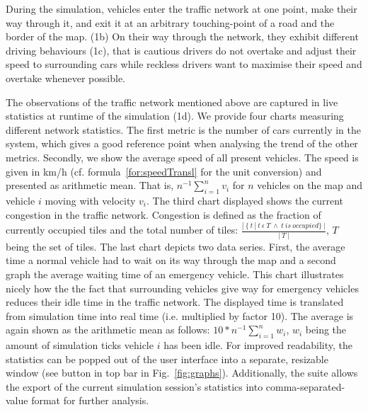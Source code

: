 During the simulation, vehicles enter the traffic network at one point, make their way through it, and exit it at an arbitrary touching-point of a road and the border of the map. (1b) On their way through the network, they exhibit different driving behaviours (1c), that is cautious drivers do not overtake and adjust their speed to surrounding cars while reckless drivers want to maximise their speed and overtake whenever possible.

The observations of the traffic network mentioned above are captured in live statistics at runtime of the simulation (1d).  We provide four charts measuring different network statistics. The first metric is the number of cars currently in the system, which gives a good reference point when analysing the trend of the other metrics. Secondly, we show the average speed of all present vehicles. The speed is given in km/h (cf. formula~\ref{for:speedTransl} for the unit conversion) and presented as arithmetic mean. That is, $ n^{-1}\sum\limits_{i=1}^n v_i$ for $n$ vehicles on the map and vehicle $i$ moving with velocity $v_i$. The third chart displayed shows the current congestion in the traffic network. Congestion is defined as the fraction of currently occupied tiles and the total number of tiles: $\frac{|\:\lbrace \:t\:|\:t\:\epsilon\:T\:\wedge\:t\:is\:occupied\rbrace\:|}{|\:T\:|}$, $T$ being the set of tiles. The last chart depicts two data series. First, the average time a normal vehicle had to wait on its way through the map and a second graph the average waiting time of an emergency vehicle. This chart illustrates nicely how the the fact that surrounding vehicles give way for emergency vehicles reduces their idle time in the traffic network. The displayed time is translated from simulation time into real time (i.e. multiplied by factor 10). The average is again shown as the arithmetic mean as follows: $10*n^{-1}\sum\limits_{i=1}^n w_i$, $w_i$ being the amount of simulation ticks vehicle $i$ has been idle. For improved readability, the statistics can be popped out of the user interface into a separate, resizable window (see button in top bar in Fig.~\ref{fig:graphs}). Additionally, the suite allows the export of the current simulation session's statistics into comma-separated-value format for further analysis.

